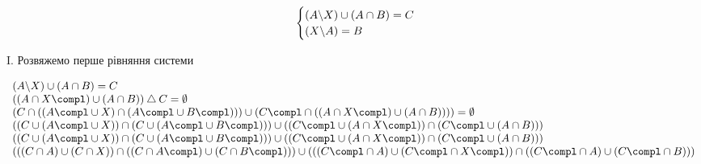 \begin{center}\large{}\end{center}

$$
\hspace{.46cm}\begin{cases}
  (A \backslash X ) \cup ( A \cap B ) = C \\
  (X \backslash A ) = B
\end{cases}
$$

I. Розвяжемо перше рівняння системи

$$
\begin{array}{l}
  (A \backslash X ) \cup ( A \cap B ) = C \\
  ( ( A \cap X\compl ) \cup ( A \cap B ) )  \bigtriangleup C = \emptyset \\
  ( C \cap ( ( A\compl \cup X ) \cap ( A\compl \cup B\compl ) )) \cup ( C\compl \cap ( ( A \cap X\compl ) \cup ( A \cap B ) ) ) ) = \emptyset \\
  ( ( C \cup ( A\compl \cup X ) ) \cap ( C \cup ( A\compl \cup B\compl ) ) ) \cup ( ( C\compl \cup ( A \cap X\compl ) ) \cap ( C\compl \cup ( A \cap B ) ) )\\
  ( ( C \cup ( A\compl \cup X ) ) \cap ( C \cup ( A\compl \cup B\compl ) ) )
    \cup
  ( ( C\compl \cup ( A \cap X\compl ) ) \cap ( C\compl \cup ( A \cap B ) ) )
  \\
  (
  ((C  \cap A ) \cup ( C  \cap X ))
  \cap
  ( ( C  \cap A\compl ) \cup  ( C  \cap B\compl ))
  ) \cup ( ( ( C\compl \cap A ) \cup ( C\compl \cap X\compl ) ) \cap ( (C\compl \cap A) \cup (C\compl \cap B ) ) )
  \end{array}
$$
